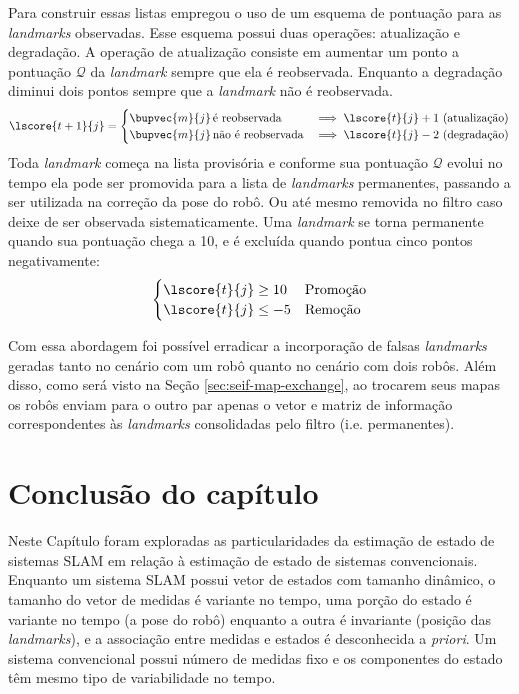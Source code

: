 Para construir essas listas  empregou 
o uso de um esquema de pontuação para as 
\textit{landmarks} observadas. Esse esquema possui duas operações: 
atualização e degradação. A operação de atualização consiste em 
aumentar um ponto a pontuação $\mathcal{Q}$ da \textit{landmark} sempre que ela 
é reobservada. Enquanto a degradação diminui dois pontos sempre que a 
\textit{landmark} não é reobservada.
\begin{equation}
  \lscore{t+1}{j} = \begin{cases}
    \bupvec{m}{j}\, \text{é reobservada} &\implies \lscore{t}{j} + 1 \,\, \text{(atualização)}\\
    \bupvec{m}{j}\, \text{não é reobservada} &\implies \lscore{t}{j} - 2 \,\, \text{(degradação)}\\
  \end{cases}
  \label{eq:landmark-quality}
\end{equation}
Toda \textit{landmark} começa na lista provisória e conforme sua 
pontuação $\mathcal{Q}$ evolui no tempo ela pode ser promovida para a 
lista de \textit{landmarks} permanentes, passando a ser utilizada na 
correção da pose do robô. Ou até mesmo removida no filtro caso deixe de 
ser observada sistematicamente. Uma \textit{landmark} se torna 
permanente quando sua pontuação chega a 10, e é excluída quando pontua 
cinco pontos negativamente:
\begin{equation}
  \begin{cases}
    \lscore{t}{j} \geq 10 & \text{Promoção}\\
    \lscore{t}{j} \leq -5 & \text{Remoção}\\
  \end{cases} 
\end{equation}

Com essa abordagem foi possível erradicar a incorporação de 
falsas \textit{landmarks} geradas tanto no cenário com um robô quanto 
no cenário com dois robôs. Além disso, como será visto na Seção \ref{sec:seif-map-exchange}, ao trocarem seus mapas os robôs enviam para o 
outro par apenas o vetor e matriz de informação correspondentes às 
\textit{landmarks} consolidadas pelo filtro (i.e. permanentes).

\section{Conclusão do capítulo}
Neste Capítulo foram exploradas as particularidades da estimação de 
estado de sistemas SLAM em relação à estimação de estado de sistemas 
convencionais. Enquanto um sistema SLAM possui vetor de estados com 
tamanho dinâmico, o tamanho do vetor de medidas é variante no tempo, uma porção do estado é variante no tempo (a pose do robô) enquanto a 
outra é invariante (posição das \textit{landmarks}), e a associação 
entre medidas e estados é desconhecida a \textit{priori}. Um sistema convencional possui número de medidas fixo e os componentes do estado têm mesmo 
tipo de variabilidade no tempo. 

